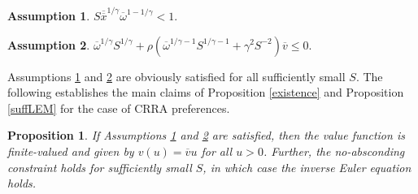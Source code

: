 \documentclass[11pt]{article}
\theoremstyle{plain}
\newtheorem{prop}[thm]{Proposition}
\theoremstyle{definition} %
\newtheorem{assump}{Assumption}[section]
\begin{document}
\begin{assump}\label{ASSsuffCRRA}
$S\overline{\overline{x}}^{1/\gamma}\overline{\omega}^{1-1/\gamma} < 1$. 
\end{assump}

\begin{assump}\label{ASSsuffCRRA2}
$\overline{\omega}^{1/\gamma}S^{1/\gamma} + \rho{\left(\overline{\omega}^{1/\gamma-1}S^{1/\gamma-1} + \gamma^2 S^{-2}\right)}\overline{v} \leq 0$.
\end{assump}

Assumptions \ref{ASSsuffCRRA} and \ref{ASSsuffCRRA2} are obviously satisfied for all sufficiently small $S$. The following establishes the main claims of Proposition \ref{existence} and Proposition \ref{suffLEM} for the case of CRRA preferences. 

\begin{prop} \label{existenceCRRA}
If Assumptions \ref{ASSsuffCRRA} and \ref{ASSsuffCRRA2} are satisfied, then the value function is finite-valued and given by $v(u) = \overline{v}u$ for all $u > 0$. Further, the no-absconding constraint holds for sufficiently small $S$, in which case the inverse Euler equation holds. 
\end{prop}
\end{document}
